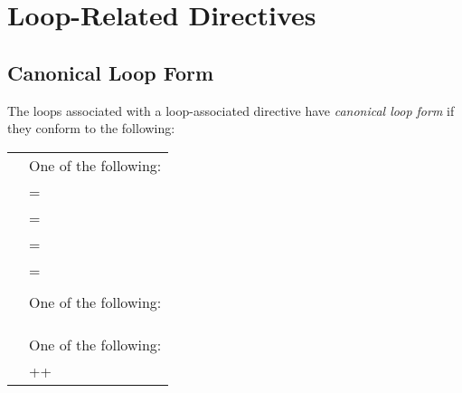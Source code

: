 \section{Loop-Related Directives}
\label{sec:LoopRelatedConstructs}

\subsection{Canonical Loop Form}
\label{subsec:Canonical Loop Form}
\begin{ccppspecific}
The loops associated with a loop-associated directive have \emph{canonical loop form} 
if they conform to the following:

\medskip
\nolinenumbers
\renewcommand{\arraystretch}{1.0}
\tablelasttail{\hline}
\begin{supertabular}{ p{0.8in} p{4.5in}}
    {} & One of the following:\\
    & {} = {}\\
    & {} {} = {}\\
    & {} {} = {}\\
    & {} {} = {}\\
    & \\
    {} & One of the following:\\
    & {} {} {}\\
    & {} {} {}\\
    & \\
    {} & One of the following:\\
    & ++{}\\

\end{supertabular}
\end{ccppspecific}
